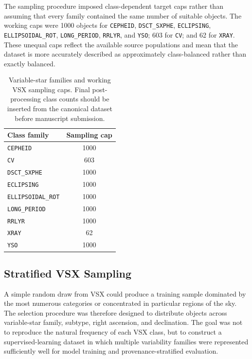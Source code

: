\documentclass[linenumbers]{aastex701}
\begin{document}
The sampling procedure imposed class-dependent target caps rather than assuming that every family contained the same number of suitable objects. The working caps were 1000 objects for \texttt{CEPHEID}, \texttt{DSCT\_SXPHE}, \texttt{ECLIPSING}, \texttt{ELLIPSOIDAL\_ROT}, \texttt{LONG\_PERIOD}, \texttt{RRLYR}, and \texttt{YSO}; 603 for \texttt{CV}; and 62 for \texttt{XRAY}. These unequal caps reflect the available source populations and mean that the dataset is more accurately described as approximately class-balanced rather than exactly balanced.

\begin{table}[ht]
\centering
\caption{Variable-star families and working VSX sampling caps. Final post-processing class counts should be inserted from the canonical dataset before manuscript submission.}
\label{tab:class_taxonomy}
\begin{tabular}{lc}
\hline\hline
Class family & Sampling cap \\
\hline
\texttt{CEPHEID} & 1000 \\
\texttt{CV} & 603 \\
\texttt{DSCT\_SXPHE} & 1000 \\
\texttt{ECLIPSING} & 1000 \\
\texttt{ELLIPSOIDAL\_ROT} & 1000 \\
\texttt{LONG\_PERIOD} & 1000 \\
\texttt{RRLYR} & 1000 \\
\texttt{XRAY} & 62 \\
\texttt{YSO} & 1000 \\
\hline
\end{tabular}
\end{table}


\subsection{Stratified VSX Sampling}
\label{subsec:vsx_sampling}

A simple random draw from VSX could produce a training sample dominated by the most numerous categories or concentrated in particular regions of the sky. The selection procedure was therefore designed to distribute objects across variable-star family, subtype, right ascension, and declination. The goal was not to reproduce the natural frequency of each VSX class, but to construct a supervised-learning dataset in which multiple variability families were represented sufficiently well for model training and provenance-stratified evaluation.
\end{document}
